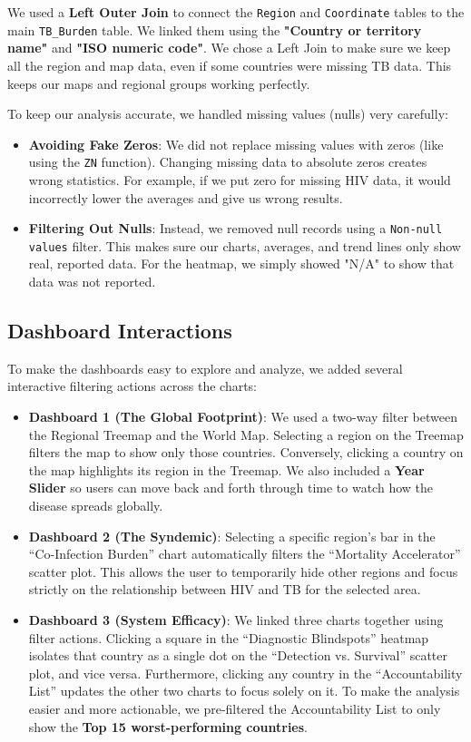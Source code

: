 \documentclass[a4paper,12pt]{extarticle}
\begin{document}
We used a \textbf{Left Outer Join} to connect the \texttt{Region} and \texttt{Coordinate} tables to the main \texttt{TB\_Burden} table. We linked them using the \textbf{"Country or territory name"} and \textbf{"ISO numeric code"}. We chose a Left Join to make sure we keep all the region and map data, even if some countries were missing TB data. This keeps our maps and regional groups working perfectly.

To keep our analysis accurate, we handled missing values (nulls) very carefully:
\begin{itemize}
    \item \textbf{Avoiding Fake Zeros}: We did not replace missing values with zeros (like using the \texttt{ZN} function). Changing missing data to absolute zeros creates wrong statistics. For example, if we put zero for missing HIV data, it would incorrectly lower the averages and give us wrong results. 
    \item \textbf{Filtering Out Nulls}: Instead, we removed null records using a \texttt{Non-null values} filter. This makes sure our charts, averages, and trend lines only show real, reported data. For the heatmap, we simply showed "N/A" to show that data was not reported.
\end{itemize}

\subsection{Dashboard Interactions}
To make the dashboards easy to explore and analyze, we added several interactive filtering actions across the charts:

\begin{itemize}
    \item \textbf{Dashboard 1 (The Global Footprint)}: We used a two-way filter between the Regional Treemap and the World Map. Selecting a region on the Treemap filters the map to show only those countries. Conversely, clicking a country on the map highlights its region in the Treemap. We also included a \textbf{Year Slider} so users can move back and forth through time to watch how the disease spreads globally.
    
    \item \textbf{Dashboard 2 (The Syndemic)}: Selecting a specific region's bar in the ``Co-Infection Burden'' chart automatically filters the ``Mortality Accelerator'' scatter plot. This allows the user to temporarily hide other regions and focus strictly on the relationship between HIV and TB for the selected area.
    
    \item \textbf{Dashboard 3 (System Efficacy)}: We linked three charts together using filter actions. Clicking a square in the ``Diagnostic Blindspots'' heatmap isolates that country as a single dot on the ``Detection vs. Survival'' scatter plot, and vice versa. Furthermore, clicking any country in the ``Accountability List'' updates the other two charts to focus solely on it. To make the analysis easier and more actionable, we pre-filtered the Accountability List to only show the \textbf{Top 15 worst-performing countries}.
\end{itemize}
\end{document}
